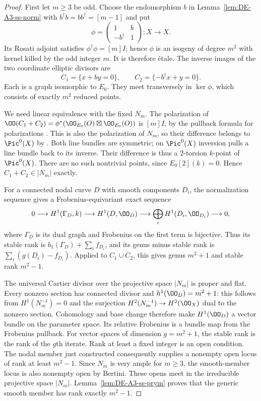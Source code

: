 \begin{proof}
First let $m\ge3$ be odd.  Choose the endomorphism $b$ in
Lemma~\ref{lem:DE-A3-ss-norm} with $b^\dagger b=bb^\dagger=[m-1]$ and put
\[
 \phi=\begin{pmatrix}1&b\\-b^\dagger&1\end{pmatrix}:X\longrightarrow X.
\]
Its Rosati adjoint satisfies $\phi^\dagger\phi=[m]I$; hence $\phi$ is an
isogeny of degree $m^2$ with kernel killed by the odd integer $m$.
It is therefore \'etale.  The inverse images of the two coordinate
elliptic divisors are
\[
 C_1=\{x+by=0\},\qquad C_2=\{-b^\dagger x+y=0\}.
\]
Each is a graph isomorphic to $E_0$.  They meet transversely in
$\ker\phi$, which consists of exactly $m^2$ reduced points.

We need linear equivalence with the fixed $N_m$.  The polarization of
$\OO(C_1+C_2)=\phi^*(\OO_{E_0}(O)\boxtimes\OO_{E_0}(O))$ is $[m]I$,
by the pullback formula for polarizations
\cite[Proposition~7.6]{EdixhovenVanDerGeerMoonenAV}.
This is also the polarization of $N_m$, so their difference belongs to
$\Pic^0(X)$ by \cite[Corollary~7.22]{EdixhovenVanDerGeerMoonenAV}.  Both line bundles are symmetric; on $\Pic^0(X)$ inversion
pulls a line bundle back to its inverse.  Their difference is thus a
$2$-torsion $k$-point of $\Pic^0(X)$.  There are no such nontrivial points,
since $E_0[2](k)=0$.  Hence $C_1+C_2\in|N_m|$ exactly.

For a connected nodal curve $D$ with smooth components $D_i$, the
normalization sequence gives a Frobenius-equivariant exact sequence
\[
 0\longrightarrow H^1(\Gamma_D,k)
 \longrightarrow H^1(D,\OO_D)
 \longrightarrow\bigoplus_iH^1(D_i,\OO_{D_i})\longrightarrow0,
\]
where $\Gamma_D$ is its dual graph and Frobenius on the first term is
bijective.  Thus its stable rank is
$b_1(\Gamma_D)+\sum_i f_{D_i}$, and its genus minus stable rank is
$\sum_i(g(D_i)-f_{D_i})$.  Applied to $C_1\cup C_2$, this gives genus
$m^2+1$ and stable rank $m^2-1$.

The universal Cartier divisor over the projective space $|N_m|$ is proper
and flat.  Every nonzero section has connected divisor and
$h^1(\OO_D)=m^2+1$: this follows from
$H^1(N_m^{-1})=0$ and the surjection
$H^2(N_m^{-1})\to H^2(\OO_X)$ dual to the nonzero section.
Cohomology and base change therefore make $H^1(\OO_D)$ a vector bundle
on the parameter space.  Its relative Frobenius is a bundle map from the
Frobenius pullback.  For vector spaces of dimension $g=m^2+1$, the stable
rank is the rank of the $g$th iterate.  Rank at least a fixed integer is
an open condition.  The nodal member just constructed consequently
supplies a nonempty open locus of rank at least $m^2-1$.
Since $N_m$ is very ample for $m\ge3$, the smooth-member locus is also
nonempty open by Bertini.  These opens meet in the irreducible projective
space $|N_m|$.  Lemma~\ref{lem:DE-A3-ss-prym} proves that the generic
smooth member has rank exactly $m^2-1$.


\end{proof}
